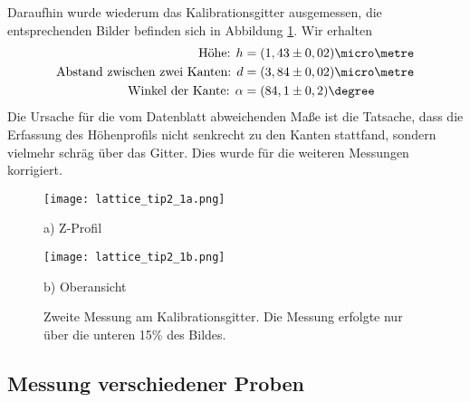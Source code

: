 Daraufhin wurde wiederum das Kalibrationsgitter ausgemessen, die entsprechenden Bilder befinden sich in Abbildung \ref{fig:Lattice3}. Wir erhalten\\[-2em]
\begin{align*}
\text{Höhe: }h&=(1,43\pm 0,02)\micro\metre\\
\text{Abstand zwischen zwei Kanten: }d&=(3,84 \pm 0,02)\micro\metre\\
\text{Winkel der Kante: }\alpha&=(84,1\pm 0,2)\degree
\end{align*}
Die Ursache für die vom Datenblatt abweichenden Maße ist die Tatsache, dass die Erfassung des Höhenprofils nicht senkrecht zu den Kanten stattfand, sondern vielmehr schräg über das Gitter. Dies wurde für die weiteren Messungen korrigiert.

\begin{figure}[h]
\centering
	\begin{minipage}{0.45\textwidth}
	\centering
		\texttt{[image: lattice\_tip2\_1a.png]}
		\caption*{a) Z-Profil}
	\end{minipage}
	\hfill
	\begin{minipage}{0.45\textwidth}
	\centering
		\texttt{[image: lattice\_tip2\_1b.png]}
		\caption*{b) Oberansicht}
	\end{minipage}
	\caption[Zweite Messung am Kalibrationsgitter]{Zweite Messung am Kalibrationsgitter. Die Messung erfolgte nur über die unteren 15\% des Bildes.}
	\label{fig:Lattice3}
	\vspace{-1em}
\end{figure}


\subsection{Messung verschiedener Proben}
